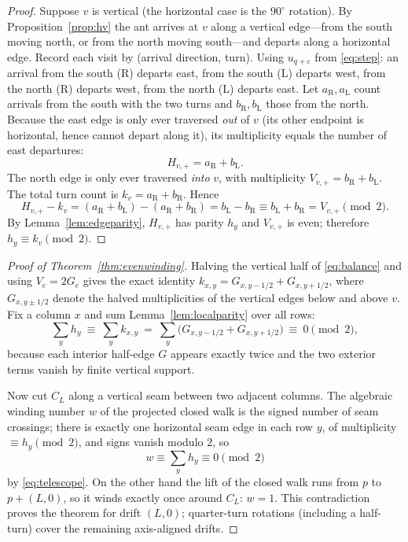 \documentclass[11pt,reqno]{amsart}
\theoremstyle{plain}
\theoremstyle{definition}
\newcommand{\turnR}{\mathrm{R}}
\newcommand{\turnL}{\mathrm{L}}
\begin{document}
\begin{proof}
Suppose $v$ is vertical (the horizontal case is the $90^\circ$ rotation). By
Proposition~\ref{prop:hv} the ant arrives at $v$ along a vertical edge---from the
south moving north, or from the north moving south---and departs along a horizontal
edge. Record each visit by (arrival direction, turn). Using
$u_{q+\varepsilon}$ from \eqref{eq:step}: an arrival from the south ($\turnR$) departs
east, from the south ($\turnL$) departs west, from the north ($\turnR$) departs west,
from the north ($\turnL$) departs east. Let $a_{\turnR},a_{\turnL}$ count arrivals
from the south with the two turns and $b_{\turnR},b_{\turnL}$ those from the north.
Because the east edge is only ever traversed \emph{out} of $v$ (its other endpoint is
horizontal, hence cannot depart along it), its multiplicity equals the number of east
departures:
\[
H_{v,+}=a_{\turnR}+b_{\turnL}.
\]
The north edge is only ever traversed \emph{into} $v$, with multiplicity
$V_{v,+}=b_{\turnR}+b_{\turnL}$. The total turn count is $k_v=a_{\turnR}+b_{\turnR}$.
Hence
\[
H_{v,+}-k_v=(a_{\turnR}+b_{\turnL})-(a_{\turnR}+b_{\turnR})=b_{\turnL}-b_{\turnR}
\equiv b_{\turnL}+b_{\turnR}=V_{v,+}\pmod2 .
\]
By Lemma~\ref{lem:edgeparity}, $H_{v,+}$ has parity $h_y$ and $V_{v,+}$ is even; therefore
$h_y\equiv k_v\pmod2$.
\end{proof}

\begin{proof}[Proof of Theorem~\ref{thm:evenwinding}]
Halving the vertical half of \eqref{eq:balance} and using $V_e=2G_e$ gives the exact
identity $k_{x,y}=G_{x,y-1/2}+G_{x,y+1/2}$, where $G_{x,y\pm1/2}$ denote the halved
multiplicities of the vertical edges below and above $v$. Fix a column $x$ and sum
Lemma~\ref{lem:localparity} over all rows:
\begin{equation}\label{eq:telescope}
\sum_y h_y\ \equiv\ \sum_y k_{x,y}\ =\ \sum_y\bigl(G_{x,y-1/2}+G_{x,y+1/2}\bigr)\ \equiv\ 0\pmod2,
\end{equation}
because each interior half-edge $G$ appears exactly twice and the two exterior terms
vanish by finite vertical support.

Now cut $C_L$ along a vertical seam between two adjacent columns. The algebraic
winding number $w$ of the projected closed walk is the signed number of seam
crossings; there is exactly one horizontal seam edge in each row $y$, of multiplicity
$\equiv h_y\pmod2$, and signs vanish modulo $2$, so
\[
w\equiv\sum_y h_y\equiv0\pmod2
\]
by \eqref{eq:telescope}. On the other hand the lift of the closed walk runs from $p$
to $p+(L,0)$, so it winds exactly once around $C_L$: $w=1$. This contradiction proves
the theorem for drift $(L,0)$; quarter-turn rotations (including a half-turn) cover the
remaining axis-aligned drifts.
\end{proof}
\end{document}
